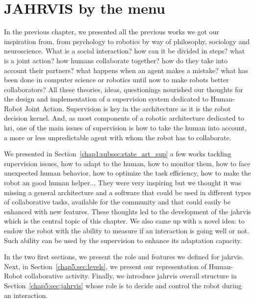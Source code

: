 \documentclass[a4paper,11pt,twoside]{StyleThese}
\begin{document}
	\setcounter{chapter}{4} %
	\dominitoc
	\faketableofcontents
	\fi

\chapter{JAHRVIS by the menu}
\label{chapter:chap2}
\minitoc


In the previous chapter, we presented all the previous works we got our inspiration from, from psychology to robotics by way of philosophy, sociology and neuroscience. What is a social interaction? how can it be divided in steps? what is a joint action? how humans collaborate together? how do they take into account their partners? what happens when an agent makes a mistake? what has been done in computer science or robotics until now to make robots better collaborators? All these theories, ideas, questionings nourished our thoughts for the design and implementation of a supervision system dedicated to Human-Robot Joint Action. Supervision is key in the architecture as it is the robot decision kernel. And, as most components of a robotic architecture dedicated to \acrshort{hri}, one of the main issues of supervision is how to take the human into account, a more or less unpredictable agent with whom the robot has to collaborate. 

We presented in Section~\ref{chap1:subsec:state_art_sup} a few works tackling supervision issues, \ie how to adapt to the human, how to monitor them, how to face unexpected human behavior, how to optimize the task efficiency, how to make the robot an good human helper... They were very inspiring but we thought it was missing a general architecture and a software that could be used in different types of collaborative tasks, available for the community and that could easily be enhanced with new features. These thoughts led to the development of the \acrfull{jahrvis} which is the central topic of this chapter. We also came up with a novel idea: to endow the robot with the ability to measure if an interaction is going well or not. Such ability can be used by the supervision to enhance its adaptation capacity.

In the two first sections, we present the role and features we defined for \acrshort{jahrvis}. Next, in Section~\ref{chap5:sec:levels}, we present our representation of Human-Robot collaborative activity. Finally, we introduce \acrshort{jahrvis} overall structure in Section~\ref{chap5:sec:jahrvis} whose role is to decide and control the robot during an interaction.
\end{document}
